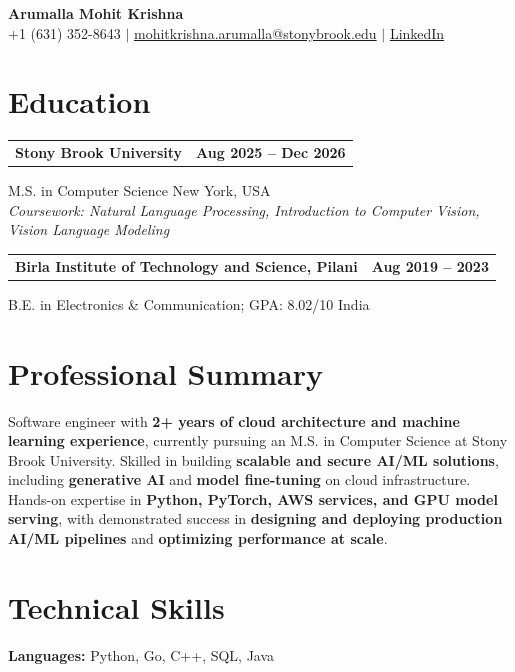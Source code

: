 \documentclass[letterpaper,10pt]{article}
\makeatletter
\newcommand{\entry}[2]{%
  \noindent
  \begin{tabularx}{\linewidth}
    {@{}>{\raggedright\arraybackslash}X@{\hspace{6pt}}r@{}}
    \textbf{#1} & #2
  \end{tabularx}\par
}
\makeatother
\begin{document}
\begin{center}
    {\LARGE\bfseries Arumalla Mohit Krishna}\\[3pt]
    +1 (631) 352-8643 $|$
    \href{mailto:mohitkrishna.arumalla@stonybrook.edu}
    {mohitkrishna.arumalla@stonybrook.edu} $|$
    \href{https://linkedin.com/in/mohit-krishna-arumalla}
    {LinkedIn}
\end{center}
\vspace{-8pt}

\section{Education}

\entry
  {\textbf{Stony Brook University}}
  {\textbf{Aug 2025 -- Dec 2026}}

M.S. in Computer Science \hfill New York, USA\\
\textit{
Coursework: Natural Language Processing,
Introduction to Computer Vision, Vision Language Modeling
}
\vspace{3pt}

\entry
  {\textbf{Birla Institute of Technology and Science, Pilani}}
  {\textbf{Aug 2019 -- 2023}}

B.E. in Electronics \& Communication; GPA: 8.02/10 \hfill India

\section{Professional Summary}

Software engineer with \textbf{2+ years of cloud architecture and machine learning experience}, currently pursuing an M.S. in Computer Science at Stony Brook University. Skilled in building \textbf{scalable and secure AI/ML solutions}, including \textbf{generative AI} and \textbf{model fine-tuning} on cloud infrastructure. Hands-on expertise in \textbf{Python, PyTorch, AWS services, and GPU model serving}, with demonstrated success in \textbf{designing and deploying production AI/ML pipelines} and \textbf{optimizing performance at scale}.

\section{Technical Skills}

\textbf{Languages:}
Python, Go, C++, SQL, Java\\
\end{document}
